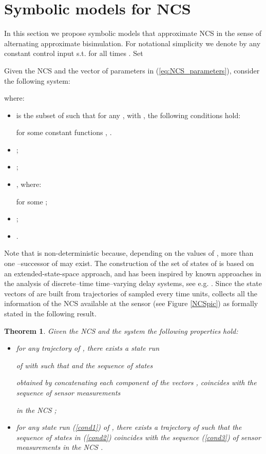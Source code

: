 \documentclass{amsart}
\newtheorem{theorem}{Theorem}[section]
\begin{document}
\section{Symbolic models for NCS}\label{sec:SymbolicModels}

In this section we propose symbolic models that approximate NCS in the sense of alternating approximate bisimulation. 
For notational simplicity we denote by  any constant control input  s.t.  for all times . Set 

Given the NCS  and the vector  of parameters in (\ref{eq:NCS_parameters}), consider the following system:


where:

\begin{itemize}
\item  is the subset of  such that for any , with , the following conditions hold:

for some constant functions , .
\item ;
\item ;
\item , where:

for some ;
\item ;
\item .
\end{itemize}

Note that  is non-deterministic because, depending on the values of , more than one --successor of  may exist. The construction of the set of states of  is based on an extended-state-space approach, and has been inspired by known approaches in the analysis of discrete--time time--varying delay systems, see e.g. \cite{TDSDT}.  
Since the state vectors of  are built from trajectories of  sampled every  time units,  collects all the information of the NCS  available at the sensor (see Figure \ref{NCSpic}) as formally stated in the following result.
\begin{theorem}
Given the NCS  and the system  the following properties hold:
\begin{itemize}
\item for any trajectory  of , there exists a state run 

of  with  such that  and the sequence of states 


obtained by concatenating each component of the vectors , coincides with the sequence of sensor measurements

in the NCS ;
\item for any state run (\ref{cond1}) of , there exists a trajectory  of  such that the sequence of states in (\ref{cond2}) coincides with the sequence (\ref{cond3}) of sensor measurements in the NCS .
\end{itemize}
\end{theorem}
\end{document}
